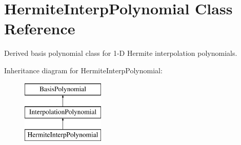 \section{Hermite\+Interp\+Polynomial Class Reference}
\label{classPecos_1_1HermiteInterpPolynomial}


Derived basis polynomial class for 1-\/D Hermite interpolation polynomials.  


Inheritance diagram for Hermite\+Interp\+Polynomial\+:\begin{figure}[H]
\begin{center}
\leavevmode
\includegraphics[height=3.000000cm]{classPecos_1_1HermiteInterpPolynomial}
\end{center}
\end{figure}
